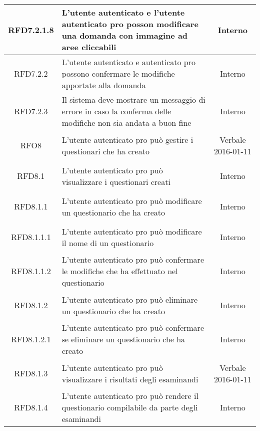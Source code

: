 \begin{longtable}{|c|>{\centering}m{7cm}|c|}
\hypertarget{RFD7.2.1.8}{RFD7.2.1.8} & L’utente autenticato e l’utente autenticato pro posson modificare una domanda con immagine ad aree cliccabili & Interno
\\ \hline

\hypertarget{RFD7.2.2}{RFD7.2.2} & L’utente autenticato e autenticato pro possono confermare le modifiche apportate alla domanda & Interno
\\ \hline

\hypertarget{RFD7.2.3}{RFD7.2.3} & Il sistema deve mostrare un messaggio di errore in caso la conferma delle modifiche non sia andata a buon fine & Interno
\\ \hline

\hypertarget{RFO8}{RFO8} & L’utente autenticato pro può gestire i questionari che ha creato & Verbale 2016-01-11
\\ \hline

\hypertarget{RFD8.1}{RFD8.1} & L’utente autenticato pro può visualizzare i questionari creati & Interno
\\ \hline

\hypertarget{RFD8.1.1}{RFD8.1.1} & L’utente autenticato pro può modificare un questionario che ha creato & Interno
\\ \hline

\hypertarget{RFD8.1.1.1}{RFD8.1.1.1} & L’utente autenticato pro può modificare il nome di un questionario & Interno
\\ \hline

\hypertarget{RFD8.1.1.2}{RFD8.1.1.2} & L’utente autenticato pro può confermare le modifiche che ha effettuato nel questionario & Interno
\\ \hline

\hypertarget{RFD8.1.2}{RFD8.1.2} & L’utente autenticato pro può eliminare un questionario che ha creato & Interno
\\ \hline

\hypertarget{RFD8.1.2.1}{RFD8.1.2.1} & L’utente autenticato pro può confermare se eliminare un questionario che ha creato & Interno
\\ \hline

\hypertarget{RFD8.1.3}{RFD8.1.3} & L’utente autenticato pro può visualizzare i risultati degli esaminandi  & Verbale 2016-01-11
\\ \hline

\hypertarget{RFD8.1.4}{RFD8.1.4} & L’utente autenticato pro può rendere il questionario compilabile da parte degli esaminandi & Interno
\\ \hline


\end{longtable}
